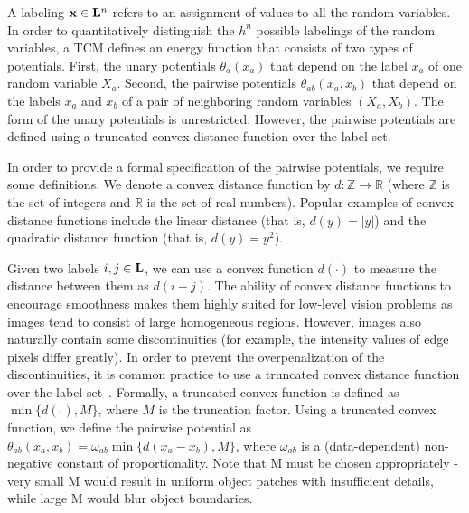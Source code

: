 \documentclass[runningheads]{llncs}
\begin{document}
A labeling ${\bf x} \in {\bf L}^n$ refers to an assignment of values to all the random variables.
In order to quantitatively distinguish the $h^n$ possible labelings of the random variables, a TCM defines an energy function that consists of
two types of potentials. First, the unary potentials $\theta_a(x_a)$ that depend on the label $x_a$ of one random variable $X_a$. Second,
the pairwise potentials $\theta_{ab}(x_a,x_b)$ that depend on the labels $x_a$ and $x_b$ of a pair of neighboring random variables
$(X_a,X_b)$. The form of the unary potentials is unrestricted. However, the pairwise potentials
are defined using a truncated convex distance function over the label set.

In order to provide a formal specification of the pairwise potentials, we require some definitions. We denote a convex distance function by
$d: \mathbb{Z} \rightarrow \mathbb{R}$ (where $\mathbb{Z}$ is the set of integers and $\mathbb{R}$ is the set of real numbers).
Popular examples of convex distance functions include the linear distance (that is, $d(y) = |y|$) and the quadratic
distance function (that is, $d(y) = y^2$).

Given two labels $i,j \in {\bf L}$, we can use a convex function $d(\cdot)$ to measure the distance between them as $d(i-j)$. The ability of convex distance functions to encourage smoothness makes them highly suited for low-level vision problems as images tend to
consist of large homogeneous regions. However, images
also naturally contain some discontinuities (for example, the intensity values of edge pixels differ greatly). In order to prevent
the overpenalization of the discontinuities, it is common practice to use a truncated convex distance function over the
label set~\cite{boykovpami01,kumarnips08,vekslercvpr07}.
Formally, a truncated convex function is defined as $\min\{d(\cdot),M\}$, where $M$ is the truncation factor. Using a truncated
convex function, we define the pairwise potential as $\theta_{ab}(x_a,x_b) = \omega_{ab}\min\{d(x_a-x_b),M\}$, where $\omega_{ab}$ is a
(data-dependent) non-negative constant of proportionality. Note that M must be chosen appropriately - very small M would result in uniform object patches with insufficient details, while large M would blur object boundaries.
\end{document}
